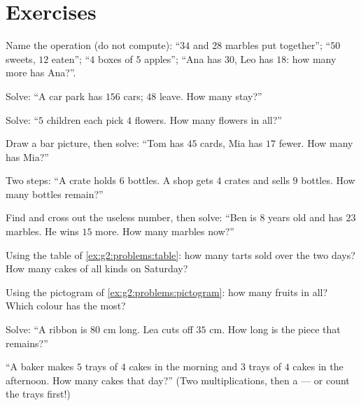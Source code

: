 \section{Exercises}

\begin{exercise}[$\star$]\label{exo:g2:problems:1}
Name the operation (do not compute): ``$34$ and $28$ marbles put
together''; ``$50$ sweets, $12$ eaten''; ``$4$ boxes of $5$
apples''; ``Ana has $30$, Leo has $18$: how many more has Ana?''.
\end{exercise}

\begin{exercise}[$\star$]\label{exo:g2:problems:2}
Solve: ``A car park has $156$ cars; $48$ leave. How many stay?''
\end{exercise}

\begin{exercise}[$\star$]\label{exo:g2:problems:3}
Solve: ``$5$ children each pick $4$ flowers. How many flowers in
all?''
\end{exercise}

\begin{exercise}[$\star$]\label{exo:g2:problems:4}
Draw a bar picture, then solve: ``Tom has $45$ cards, Mia has $17$
fewer. How many has Mia?''
\end{exercise}

\begin{exercise}[$\star$]\label{exo:g2:problems:5}
Two steps: ``A crate holds $6$ bottles. A shop gets $4$ crates and
sells $9$ bottles. How many bottles remain?''
\end{exercise}

\begin{exercise}[$\star$]\label{exo:g2:problems:6}
Find and cross out the useless number, then solve: ``Ben is $8$
years old and has $23$ marbles. He wins $15$ more. How many marbles
now?''
\end{exercise}

\begin{exercise}[$\star$]\label{exo:g2:problems:7}
Using the table of \cref{ex:g2:problems:table}: how many tarts sold
over the two days? How many cakes of all kinds on Saturday?
\end{exercise}

\begin{exercise}[$\star$]\label{exo:g2:problems:8}
Using the pictogram of \cref{ex:g2:problems:pictogram}: how many
fruits in all? Which colour has the most?
\end{exercise}

\begin{exercise}[$\star$]\label{exo:g2:problems:9}
Solve: ``A ribbon is $80$ cm long. Lea cuts off $35$ cm. How long is
the piece that remains?''
\end{exercise}

\begin{exercise}[$\star\star$]\label{exo:g2:problems:10}
``A baker makes $5$ trays of $4$ cakes in the morning and $3$ trays
of $4$ cakes in the afternoon. How many cakes that day?'' (Two
multiplications, then a  --- or count the trays first!)
\end{exercise}
